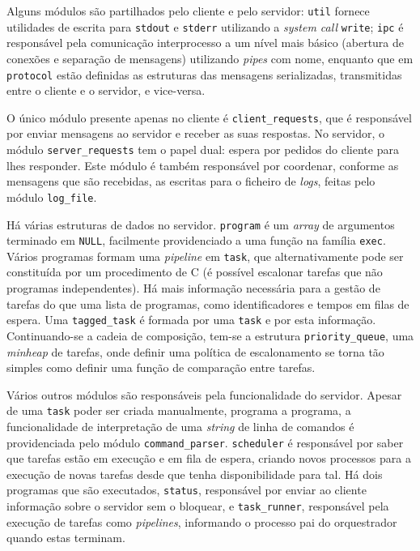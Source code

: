 \documentclass[11pt]{article}
\begin{document}
Alguns módulos são partilhados pelo cliente e pelo servidor: \texttt{util} fornece utilidades de
escrita para \texttt{stdout} e \texttt{stderr} utilizando a \emph{system call} \texttt{write};
\texttt{ipc} é responsável pela comunicação interprocesso a um nível mais básico (abertura de
conexões e separação de mensagens) utilizando \emph{pipes} com nome, enquanto que em
\texttt{protocol} estão definidas as estruturas das mensagens serializadas, transmitidas entre o
cliente e o servidor, e vice-versa.

O único módulo presente apenas no cliente é \texttt{client\_requests}, que é responsável por enviar
mensagens ao servidor e receber as suas respostas. No servidor, o módulo \texttt{server\_requests}
tem o papel dual: espera por pedidos do cliente para lhes responder. Este módulo é também
responsável por coordenar, conforme as mensagens que são recebidas, as escritas para o ficheiro de
\emph{logs}, feitas pelo módulo \texttt{log\_file}.

Há várias estruturas de dados no servidor. \texttt{program} é um \emph{array} de argumentos
terminado em \texttt{NULL}, facilmente providenciado a uma função na família \texttt{exec}. Vários
programas formam uma \emph{pipeline} em \texttt{task}, que alternativamente pode ser constituída por
um procedimento de C (é possível escalonar tarefas que não programas independentes). Há mais
informação necessária para a gestão de tarefas do que uma lista de programas, como identificadores e
tempos em filas de espera. Uma \texttt{tagged\_task} é formada por uma \texttt{task} e por esta
informação. Continuando-se a cadeia de composição, tem-se a estrutura \texttt{priority\_queue}, uma
\emph{minheap} de tarefas, onde definir uma política de escalonamento se torna tão simples como
definir uma função de comparação entre tarefas.

Vários outros módulos são responsáveis pela funcionalidade do servidor. Apesar de uma \texttt{task}
poder ser criada manualmente, programa a programa, a funcionalidade de interpretação de uma
\emph{string} de linha de comandos é providenciada pelo módulo \texttt{command\_parser}.
\texttt{scheduler} é responsável por saber que tarefas estão em execução e em fila de espera,
criando novos processos para a execução de novas tarefas desde que tenha disponibilidade para tal.
Há dois programas que são executados, \texttt{status}, responsável por enviar ao cliente informação
sobre o servidor sem o bloquear, e \texttt{task\_runner}, responsável pela execução de tarefas
como \emph{pipelines}, informando o processo pai do orquestrador quando estas terminam.
\end{document}
